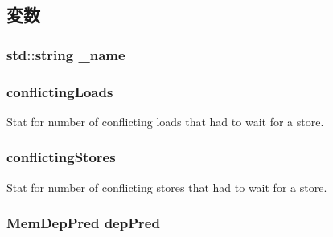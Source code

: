 \subsection{変数}
\hypertarget{classMemDepUnit_aaf2ed934b37cbbd236fdd1b01a5f5005}{
\subsubsection[{\_\-name}]{\setlength{\rightskip}{0pt plus 5cm}std::string {\bf \_\-name}}}
\label{classMemDepUnit_aaf2ed934b37cbbd236fdd1b01a5f5005}
\hypertarget{classMemDepUnit_ad5a10b8601553be6d0f3bfa3495dd5a5}{
\subsubsection[{conflictingLoads}]{ {\bf conflictingLoads}}}
\label{classMemDepUnit_ad5a10b8601553be6d0f3bfa3495dd5a5}
Stat for number of conflicting loads that had to wait for a store. \hypertarget{classMemDepUnit_ab481d99d6034a2db5e14efd072448635}{
\subsubsection[{conflictingStores}]{ {\bf conflictingStores}}}
\label{classMemDepUnit_ab481d99d6034a2db5e14efd072448635}
Stat for number of conflicting stores that had to wait for a store. \hypertarget{classMemDepUnit_a2b12193ddce173c34c8c54e0201925bc}{
\subsubsection[{depPred}]{\setlength{\rightskip}{0pt plus 5cm}MemDepPred {\bf depPred}}}
